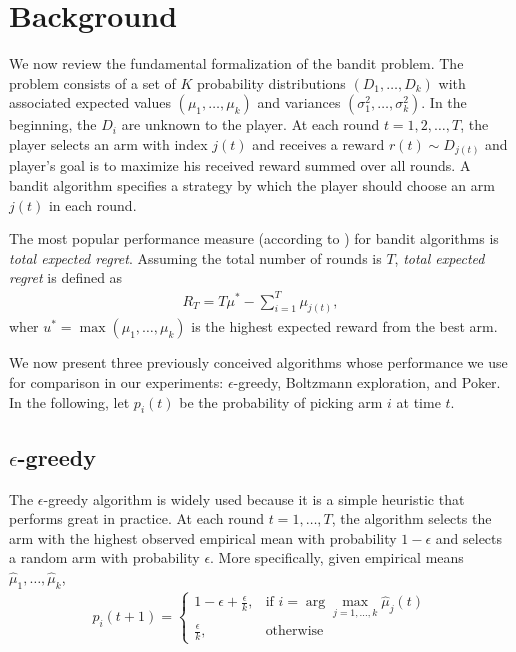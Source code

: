 \documentclass[12pt]{article}
\begin{document}
\section{Background}
We now review the fundamental formalization of the bandit problem. The problem consists of a set of $K$ probability distributions
$(D_1, \ldots, D_k)$ with associated expected values $(\mu_1, \ldots, \mu_k)$ and variances $(\sigma^2_1, \ldots, \sigma^2_k)$.
In the beginning, the $D_i$ are unknown to the player.  At each round $t = 1,2,\ldots,T$, the player selects an arm with index $j(t)$
and receives a reward $r(t) \sim D_{j(t)}$ and player's goal is to maximize his received reward summed over all rounds.  A bandit algorithm
specifies a strategy by which the player should choose an arm $j(t)$ in each round.

The most popular performance measure (according to \cite{Kuleshov}) for bandit algorithms is \emph{total expected regret}.  Assuming the 
total number of rounds is $T$, \emph{total expected regret} is defined as
\begin{align}
R_T = T\mu^{*} - \sum_{i=1}^{T} \mu_{j(t)},
\end{align}
wher $u^{*} = \max(\mu_1, \ldots, \mu_k)$ is the highest expected reward from the best arm. 

We now present three previously conceived algorithms whose performance we use for comparison in our experiments:  $\epsilon$-greedy, Boltzmann exploration, and Poker.
In the following, let $p_i(t)$ be the probability of picking arm $i$ at time $t$.

\subsection{$\epsilon$-greedy}
The $\epsilon$-greedy algorithm is widely used because it is a simple heuristic that performs great in practice. 
At each round $t = 1, \ldots, T$, the algorithm selects the arm with the highest observed empirical mean with probability $1 - \epsilon$ and
selects a random arm with probability $\epsilon$.  More specifically, given empirical means $\hat{\mu}_1, \ldots, \hat{\mu}_k$,
\begin{align*}
p_i(t+1) = 
\begin{cases}
1 - \epsilon + \frac{\epsilon}{k}, & \textrm{if } i = \arg \max_{j = 1, \ldots, k} \hat{\mu}_j(t) \\
\frac{\epsilon}{k}, & \textrm{otherwise}
\end{cases}
\end{align*}
\end{document}
